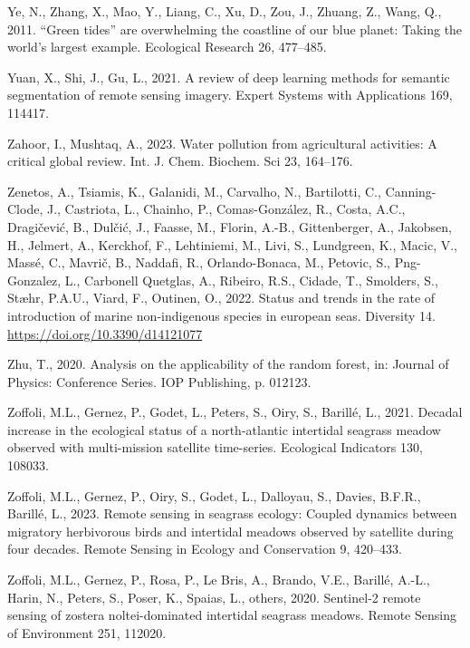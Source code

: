 \documentclass[
  letterpaper,
  11pt,
  english,
  singlespacing,
  headsepline]{MastersDoctoralThesis}
\newlength{\cslhangindent}
\newenvironment{CSLReferences}[2] %
 {\begin{list}{}{%
  \setlength{\itemindent}{0pt}
  \setlength{\leftmargin}{0pt}
  \setlength{\parsep}{0pt}
  \ifodd #1
   \setlength{\leftmargin}{\cslhangindent}
   \setlength{\itemindent}{-1\cslhangindent}
  \fi
  \setlength{\itemsep}{#2\baselineskip}}}
 {\end{list}}
\begin{document}
\begin{CSLReferences}{1}{0}
Ye, N., Zhang, X., Mao, Y., Liang, C., Xu, D., Zou, J., Zhuang, Z.,
Wang, Q., 2011. {``Green tides''} are overwhelming the coastline of our
blue planet: Taking the world's largest example. Ecological Research 26,
477--485.

Yuan, X., Shi, J., Gu, L., 2021. A review of deep learning methods for
semantic segmentation of remote sensing imagery. Expert Systems with
Applications 169, 114417.

Zahoor, I., Mushtaq, A., 2023. Water pollution from agricultural
activities: A critical global review. Int. J. Chem. Biochem. Sci 23,
164--176.

Zenetos, A., Tsiamis, K., Galanidi, M., Carvalho, N., Bartilotti, C.,
Canning-Clode, J., Castriota, L., Chainho, P., Comas-González, R.,
Costa, A.C., Dragičević, B., Dulčić, J., Faasse, M., Florin, A.-B.,
Gittenberger, A., Jakobsen, H., Jelmert, A., Kerckhof, F., Lehtiniemi,
M., Livi, S., Lundgreen, K., Macic, V., Massé, C., Mavrič, B., Naddafi,
R., Orlando-Bonaca, M., Petovic, S., Png-Gonzalez, L., Carbonell
Quetglas, A., Ribeiro, R.S., Cidade, T., Smolders, S., Stæhr, P.A.U.,
Viard, F., Outinen, O., 2022. Status and trends in the rate of
introduction of marine non-indigenous species in european seas.
Diversity 14. \url{https://doi.org/10.3390/d14121077}

Zhu, T., 2020. Analysis on the applicability of the random forest, in:
Journal of Physics: Conference Series. IOP Publishing, p. 012123.

Zoffoli, M.L., Gernez, P., Godet, L., Peters, S., Oiry, S., Barillé, L.,
2021. Decadal increase in the ecological status of a north-atlantic
intertidal seagrass meadow observed with multi-mission satellite
time-series. Ecological Indicators 130, 108033.

Zoffoli, M.L., Gernez, P., Oiry, S., Godet, L., Dalloyau, S., Davies,
B.F.R., Barillé, L., 2023. Remote sensing in seagrass ecology: Coupled
dynamics between migratory herbivorous birds and intertidal meadows
observed by satellite during four decades. Remote Sensing in Ecology and
Conservation 9, 420--433.

Zoffoli, M.L., Gernez, P., Rosa, P., Le Bris, A., Brando, V.E., Barillé,
A.-L., Harin, N., Peters, S., Poser, K., Spaias, L., others, 2020.
Sentinel-2 remote sensing of zostera noltei-dominated intertidal
seagrass meadows. Remote Sensing of Environment 251, 112020.

\end{CSLReferences}
\end{document}
